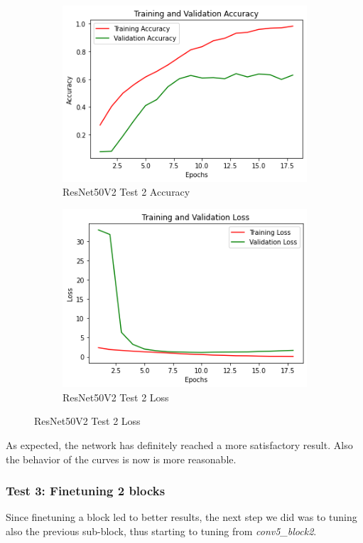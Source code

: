 \begin{figure}[H]
	\begin{subfigure}{0.5\textwidth}
		\includegraphics[width=0.9\linewidth]{img/resnet50v2/resnet50finetuned1acc.png} 
		\caption{ResNet50V2 Test 2 Accuracy}
		\label{fig:resnet50finetuned1acc}
	\end{subfigure}
	\begin{subfigure}{0.5\textwidth}
		\includegraphics[width=0.9\linewidth]{img/resnet50v2/resnet50finetuned1loss.png}
		\caption{ResNet50V2 Test 2 Loss}
		\label{fig:resnet50finetuned1loss}
	\end{subfigure}
\end{figure}

\noindent As expected, the network has definitely reached a more satisfactory result. Also the behavior of the curves is now is more reasonable. 



\subsubsection{Test 3: Finetuning 2 blocks}
Since finetuning a block led to better results, the next step we did was to tuning also the previous sub-block, thus starting to tuning from \textit{conv5\_block2}.

